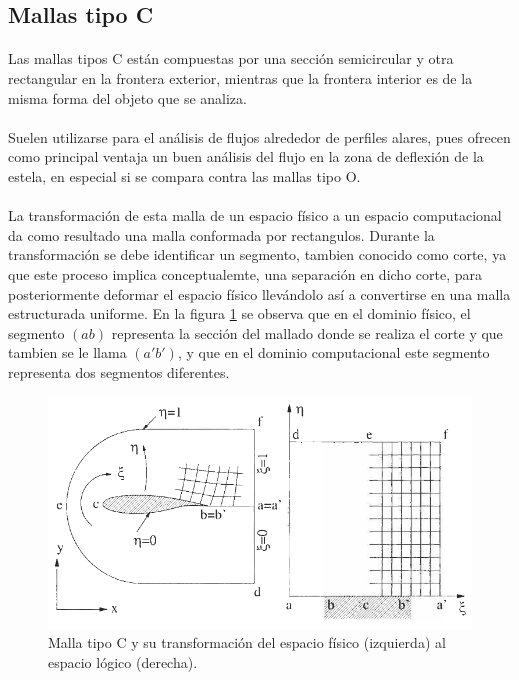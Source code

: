 \documentclass[letterpaper, openright, 12pt]{book}
\begin{document}
    \subsection{Mallas tipo C}
    \paragraph*{}
        Las mallas tipos C están compuestas por una sección semicircular y otra
        rectangular en la frontera exterior, mientras que la frontera interior
        es de la misma forma del objeto que se analiza.
    \paragraph*{}
        Suelen utilizarse para el análisis de flujos alrededor de perfiles
        alares, pues ofrecen como principal ventaja un buen análisis del flujo
        en la zona de deflexión de la estela, en especial si se compara contra
        las mallas tipo O.\cite{best-practices-grid-generation}
    \paragraph{}
        La transformación de esta malla de un espacio físico a un espacio
        computacional da como resultado una malla conformada por rectangulos.
        Durante la transformación se debe identificar un segmento, tambien
        conocido como corte, ya que este proceso implica conceptualemte, una
        separación en dicho corte, para posteriormente deformar el espacio
        físico llevándolo así a convertirse en una malla estructurada uniforme.
        En la figura \ref{fig:malla-c} se observa que en el dominio físico, el
        segmento $(ab)$ representa la sección del mallado donde se realiza el
        corte y que tambien se le llama $(a'b')$, y que en el dominio
        computacional este segmento representa dos segmentos diferentes.
            \begin{figure}[htbp!]
                \centering
                \includegraphics[keepaspectratio, width=155mm]{./Imagenes/malla-c}
                \captionsetup{justification=centering, margin=2cm}
                \caption[Malla tipo C]{Malla tipo C y su transformación del espacio físico (izquierda) al espacio lógico (derecha). \cite{blazek}}
                \label{fig:malla-c}
            \end{figure}
\end{document}
